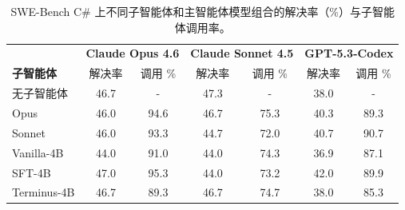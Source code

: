 \documentclass[sigconf,review]{acmart}
\begin{document}
\begin{table}[t]
\centering
\caption{SWE-Bench C\# 上不同子智能体和主智能体模型组合的解决率（\%）与子智能体调用率。}
\label{swebcs_resolve}
\scriptsize
\begin{tabular}{lcccccc}
\toprule
& \multicolumn{2}{c}{\textbf{Claude Opus 4.6}} & \multicolumn{2}{c}{\textbf{Claude Sonnet 4.5}} & \multicolumn{2}{c}{\textbf{GPT-5.3-Codex}} \\
\textbf{子智能体} & \tiny 解决率 & \tiny 调用 \% & \tiny 解决率 & \tiny 调用 \% & \tiny 解决率 & \tiny 调用 \% \\
\midrule
无子智能体   & 46.7 & - & 47.3 & - & 38.0 & - \\
Opus          & 46.0 & 94.6 & 46.7 & 75.3 & 40.3 & 89.3 \\
Sonnet        & 46.0 & 93.3 & 44.7 & 72.0 & 40.7 & 90.7 \\
Vanilla-4B    & 44.0 & 91.0 & 44.0 & 74.3 & 36.9 & 87.1 \\
SFT-4B        & 47.0 & 95.3 & 44.0 & 73.2 & 42.0 & 89.9 \\
Terminus-4B   & 46.7 & 89.3 & 46.7 & 74.7 & 38.0 & 85.3 \\
\bottomrule
\end{tabular}
\end{table}
\end{document}
